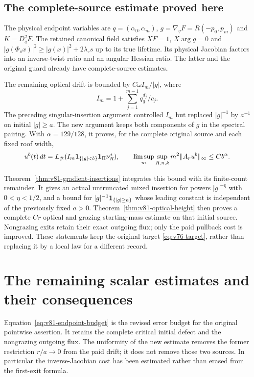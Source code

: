\documentclass[11pt,reqno]{amsart}
\numberwithin{equation}{section}
\theoremstyle{definition}\newtheorem{definition}[theorem]{Definition}
\theoremstyle{remark}\newtheorem{remark}[theorem]{Remark}
\theoremstyle{definition}\newtheorem{inputstatement}[theorem]{Input statement}
\begin{document}
\subsection{The complete-source estimate proved here}
The physical endpoint variables are
$q=(\alpha_0,\alpha_m)$, $g=\nabla_qF=R(-p_0,p_m)$ and
$K=D_q^2F$. The retained canonical field satisfies $XF=1$,
$X\arg g=0$ and
$|g(\Phi_sx)|^2\ge |g(x)|^2+2\lambda_\circ s$ up to its true
lifetime. Its physical Jacobian factors into an inverse-twist ratio
and an angular Hessian ratio. The latter and the original guard
already have complete-source estimates.

The remaining optical drift is bounded by
$C\omega I_m/|g|$, where
\[
 I_m=1+\sum_{j=1}^{m-1}q_0^{d_j}/c_j.
\]
The preceding singular-insertion argument controlled $I_m$ but
replaced $|g|^{-1}$ by $a^{-1}$ on initial $|g|\ge a$.
The new argument keeps both components of $g$ in the spectral
pairing. With $\alpha=129/128$, it proves, for the complete original
source and each fixed roof width,
\[
 u^b(t)\,dt=L_\#(I_m\mathbf1_{\{|g|<b\}}\mathbf1_\Pi\nu_R^*),\qquad
 \limsup_m\sup_{R,n,k}m^2\|A_ru^b\|_\infty\le Cb^\alpha.
\]

Theorem~\ref{thm:v81-gradient-insertions} integrates this bound with
its finite-count remainder. It gives an actual untruncated mixed
insertion for powers $|g|^{-\eta}$ with $0<\eta<1/2$, and a bound
for $|g|^{-1}\mathbf1_{\{|g|\ge a\}}$ whose leading constant is
independent of the previously fixed $a>0$.
Theorem~\ref{thm:v81-optical-height} then proves a complete
$Cr$ optical and grazing starting-mass estimate on that initial
source. Nongrazing exits retain their exact outgoing flux; only
the paid pullback cost is improved. These statements keep the
original target \eqref{eq:v76-target}, rather than replacing it by
a local law for a different record.













\section{The remaining scalar estimates and their consequences}
Equation~\eqref{eq:v81-endpoint-budget} is the revised error budget
for the original pointwise assertion. It retains the complete
critical initial defect and the nongrazing outgoing flux. The
uniformity of the new estimate removes the former restriction
$r/a\to0$ from the paid drift; it does not remove those two sources.
In particular the inverse-Jacobian cost has been estimated rather
than erased from the first-exit formula.
\end{document}
